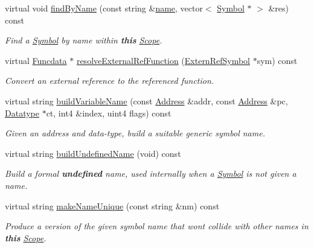 \begin{DoxyCompactItemize}
virtual void \mbox{\hyperlink{class_scope_internal_a06599bc2d7c1ccfd18f0e91a5ee956ca}{find\+By\+Name}} (const string \&\mbox{\hyperlink{class_scope_abb4900f6409e8a82c1b1cea827e4e2c5}{name}}, vector$<$ \mbox{\hyperlink{class_symbol}{Symbol}} $\ast$ $>$ \&res) const
\begin{DoxyCompactList}\small\item\em Find a \mbox{\hyperlink{class_symbol}{Symbol}} by name within {\bfseries{this}} \mbox{\hyperlink{class_scope}{Scope}}. \end{DoxyCompactList}\item 
virtual \mbox{\hyperlink{class_funcdata}{Funcdata}} $\ast$ \mbox{\hyperlink{class_scope_internal_acf54c42b2ce7edfa37f9bf1223bc2840}{resolve\+External\+Ref\+Function}} (\mbox{\hyperlink{class_extern_ref_symbol}{Extern\+Ref\+Symbol}} $\ast$sym) const
\begin{DoxyCompactList}\small\item\em Convert an {\itshape external} {\itshape reference} to the referenced function. \end{DoxyCompactList}\item 
virtual string \mbox{\hyperlink{class_scope_internal_a6009aeaf0d3973344438fb412adccd00}{build\+Variable\+Name}} (const \mbox{\hyperlink{class_address}{Address}} \&addr, const \mbox{\hyperlink{class_address}{Address}} \&pc, \mbox{\hyperlink{class_datatype}{Datatype}} $\ast$ct, int4 \&index, uint4 flags) const
\begin{DoxyCompactList}\small\item\em Given an address and data-\/type, build a suitable generic symbol name. \end{DoxyCompactList}\item 
virtual string \mbox{\hyperlink{class_scope_internal_a17225ae39210e0dbf1efb1a3ee847d72}{build\+Undefined\+Name}} (void) const
\begin{DoxyCompactList}\small\item\em Build a formal {\bfseries{undefined}} name, used internally when a \mbox{\hyperlink{class_symbol}{Symbol}} is not given a name. \end{DoxyCompactList}\item 
virtual string \mbox{\hyperlink{class_scope_internal_a193e6fb792e7cad6e451c8ecf2f7e589}{make\+Name\+Unique}} (const string \&nm) const
\begin{DoxyCompactList}\small\item\em Produce a version of the given symbol name that won\textquotesingle{}t collide with other names in {\bfseries{this}} \mbox{\hyperlink{class_scope}{Scope}}. \end{DoxyCompactList}\item 

\end{DoxyCompactItemize}
